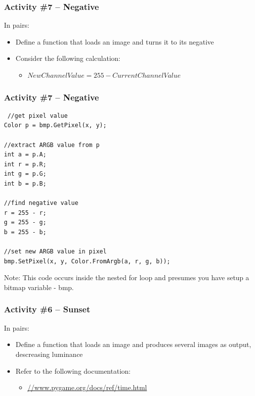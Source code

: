 \begin{frame}
	\frametitle{Activity \#7 -- Negative}
	
	In pairs:
	
	\vspace{2em}
	
	\begin{itemize}
		\item Define a function that loads an image and turns it to its negative
		\item Consider the following calculation:
		\begin{itemize}
			\item $New Channel Value = 255 - Current Channel Value$
		\end{itemize}
	\end{itemize}
\end{frame}

\begin{frame}[fragile]
	\frametitle{Activity \#7 -- Negative}
	
\begin{lstlisting}
 //get pixel value
Color p = bmp.GetPixel(x, y);

//extract ARGB value from p
int a = p.A;
int r = p.R;
int g = p.G;
int b = p.B;

//find negative value
r = 255 - r;
g = 255 - g;
b = 255 - b;

//set new ARGB value in pixel
bmp.SetPixel(x, y, Color.FromArgb(a, r, g, b));
\end{lstlisting}

Note: This code occurs inside the nested for loop and presumes you have setup a bitmap variable - bmp.

\end{frame}
\iffalse
\begin{frame}
	\frametitle{Activity \#6 -- Sunset}
	
	In pairs:
	
	\vspace{2em}
	
	\begin{itemize}
		\item Define a function that loads an image and produces several images as output, descreasing luminance
		\item Refer to the following documentation:
		\begin{itemize}
			\item \url{//www.pygame.org/docs/ref/time.html}
		\end{itemize}
	\end{itemize}
\end{frame}


